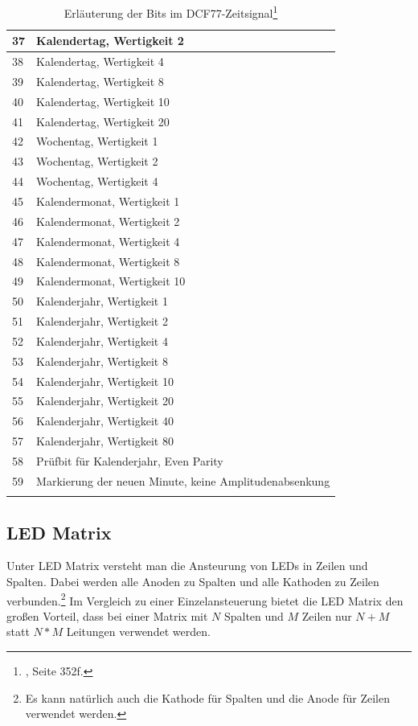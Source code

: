 \begin{longtable}{|l|l|}
37 & Kalendertag, Wertigkeit 2\\\hline
38 & Kalendertag, Wertigkeit 4\\\hline
39 & Kalendertag, Wertigkeit 8\\\hline
40 & Kalendertag, Wertigkeit 10\\\hline
41 & Kalendertag, Wertigkeit 20\\\hline
42 & Wochentag, Wertigkeit 1\\\hline
43 & Wochentag, Wertigkeit 2\\\hline
44 & Wochentag, Wertigkeit 4\\\hline
45 & Kalendermonat, Wertigkeit 1\\\hline
46 & Kalendermonat, Wertigkeit 2\\\hline
47 & Kalendermonat, Wertigkeit 4\\\hline
48 & Kalendermonat, Wertigkeit 8\\\hline
49 & Kalendermonat, Wertigkeit 10\\\hline
50 & Kalenderjahr, Wertigkeit 1\\\hline
51 & Kalenderjahr, Wertigkeit 2\\\hline
52 & Kalenderjahr, Wertigkeit 4\\\hline
53 & Kalenderjahr, Wertigkeit 8\\\hline
54 & Kalenderjahr, Wertigkeit 10\\\hline
55 & Kalenderjahr, Wertigkeit 20\\\hline
56 & Kalenderjahr, Wertigkeit 40\\\hline
57 & Kalenderjahr, Wertigkeit 80\\\hline
58 & Prüfbit für Kalenderjahr, Even Parity\\\hline
59 & Markierung der neuen Minute, keine Amplitudenabsenkung\\\hline
\caption{Erläuterung der Bits im DCF77-Zeitsignal\footnote{\cite{dcf77}, Seite 352f.}}\label{tbl_dcf77kod}
\end{longtable}
%
\subsection{LED Matrix}
Unter LED Matrix versteht man die Ansteurung von LEDs in Zeilen und Spalten. Dabei werden alle Anoden zu Spalten und alle Kathoden zu Zeilen
verbunden.\footnote{Es kann natürlich auch die Kathode für Spalten und die
Anode für Zeilen verwendet werden.} Im Vergleich zu einer Einzelansteuerung
bietet die LED Matrix den großen Vorteil, dass bei einer Matrix mit $N$ Spalten
und $M$ Zeilen nur $N+M$ statt $N*M$ Leitungen verwendet werden.

